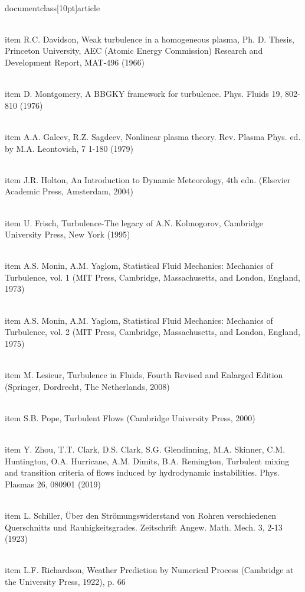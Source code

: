 \\documentclass[10pt]{article}
\begin{document}
{{{{{  \\item R.C. Davidson, Weak turbulence in a homogeneous plasma, Ph. D. Thesis, Princeton University, AEC (Atomic Energy Commission) Research and Development Report, MAT-496 (1966)

  \\item D. Montgomery, A BBGKY framework for turbulence. Phys. Fluids 19, 802-810 (1976)

  \\item A.A. Galeev, R.Z. Sagdeev, Nonlinear plasma theory. Rev. Plasma Phys. ed. by M.A. Leontovich, 7 1-180 (1979)

  \\item J.R. Holton, An Introduction to Dynamic Meteorology, 4th edn. (Elsevier Academic Press, Amsterdam, 2004)

  \\item U. Frisch, Turbulence-The legacy of A.N. Kolmogorov, Cambridge University Press, New York (1995)

  \\item A.S. Monin, A.M. Yaglom, Statistical Fluid Mechanics: Mechanics of Turbulence, vol. 1 (MIT Press, Cambridge, Massachusetts, and London, England, 1973)

  \\item A.S. Monin, A.M. Yaglom, Statistical Fluid Mechanics: Mechanics of Turbulence, vol. 2 (MIT Press, Cambridge, Massachusetts, and London, England, 1975)

  \\item M. Lesieur, Turbulence in Fluids, Fourth Revised and Enlarged Edition (Springer, Dordrecht, The Netherlands, 2008)

  \\item S.B. Pope, Turbulent Flows (Cambridge University Press, 2000)

  \\item Y. Zhou, T.T. Clark, D.S. Clark, S.G. Glendinning, M.A. Skinner, C.M. Huntington, O.A. Hurricane, A.M. Dimits, B.A. Remington, Turbulent mixing and transition criteria of flows induced by hydrodynamic instabilities. Phys. Plasmas 26, 080901 (2019)

  \\item L. Schiller, Über den Strömungswiderstand von Rohren verschiedenen Querschnitts und Rauhigkeitsgrades. Zeitschrift Angew. Math. Mech. 3, 2-13 (1923)

  \\item L.F. Richardson, Weather Prediction by Numerical Process (Cambridge at the University Press, 1922), p. 66

}}}}}
\end{document}
